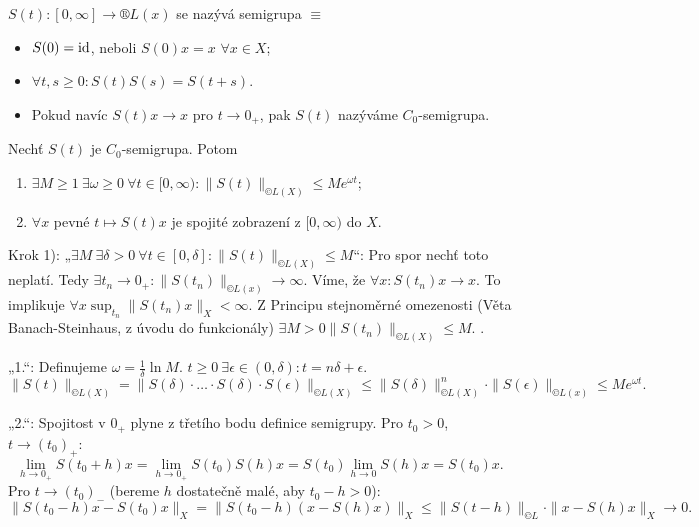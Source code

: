 \documentclass[12pt]{article}					%
\begin{document}
\begin{definice}
	$S(t): [0, ∞] \rightarrow ®L(x)$ se nazývá semigrupa $≡$

	\begin{itemize}
		\item $S(0) = \operatorname{id}$, neboli $S(0)x = x$ $\forall x \in X$;
		\item $\forall t, s ≥ 0: S(t)S(s) = S(t + s)$.
		\item Pokud navíc $S(t)x \rightarrow x$ pro $t \rightarrow 0_+$, pak $S(t)$ nazýváme $C_0$-semigrupa.
	\end{itemize}
\end{definice}

\begin{lemma}
	Nechť $S(t)$ je $C_0$-semigrupa. Potom

	\begin{enumerate}
		\item $\exists M ≥ 1\ \exists \omega ≥ 0\ \forall t \in [0, ∞): \|S(t)\|_{©L(X)} ≤ Me^{\omega t}$;
		\item $\forall x$ pevné $t \mapsto S(t) x$ je spojité zobrazení z $[0, ∞)$ do $X$.
	\end{enumerate}

	\begin{dukazin}
		Krok 1): „$\exists M\ \exists \delta > 0\ \forall t \in [0, \delta]: \|S(t)\|_{©L(X)} ≤ M$“: Pro spor nechť toto neplatí. Tedy $\exists t_n \rightarrow 0_+: \|S(t_n)\|_{©L(x)} \rightarrow ∞$. Víme, že $\forall x: S(t_n) x \rightarrow x$. To implikuje $\forall x \sup_{t_n} \|S(t_n) x\|_X < ∞$. Z Principu stejnoměrné omezenosti (Věta Banach-Steinhaus, z úvodu do funkcionály) $\exists M > 0 \|S(t_n)\|_{©L(X)} ≤ M$. \lightning.

		„1.“: Definujeme $\omega = \frac{1}{\delta} \ln M$. $t ≥ 0\ \exists \epsilon \in (0, \delta): t = n\delta + \epsilon$.
		$$ \|S(t)\|_{©L(X)} = \|S(\delta)·…·S(\delta)·S(\epsilon)\|_{©L(X)} ≤ \|S(\delta)\|_{©L(X)}^n · \|S(\epsilon)\|_{©L(x)} ≤ M e^{\omega t}. $$

		„2.“: Spojitost v $0_+$ plyne z třetího bodu definice semigrupy. Pro $t_0 > 0$, $t \rightarrow (t_0)_+$:
		$$ \lim_{h \rightarrow 0_+} S(t_0 + h) x = \lim_{h \rightarrow 0_+} S(t_0)S(h) x = S(t_0) \lim_{h \rightarrow 0} S(h)x = S(t_0)x. $$
		Pro $t \rightarrow (t_0)_-$ (bereme $h$ dostatečně malé, aby $t_0 - h > 0$):
		$$ \|S(t_0 - h) x - S(t_0) x\|_X = \|S(t_0 - h)(x - S(h) x)\|_X ≤ \|S(t - h)\|_{©L}·\|x - S(h)x\|_X \rightarrow 0. $$
	\end{dukazin}
\end{lemma}
\end{document}
